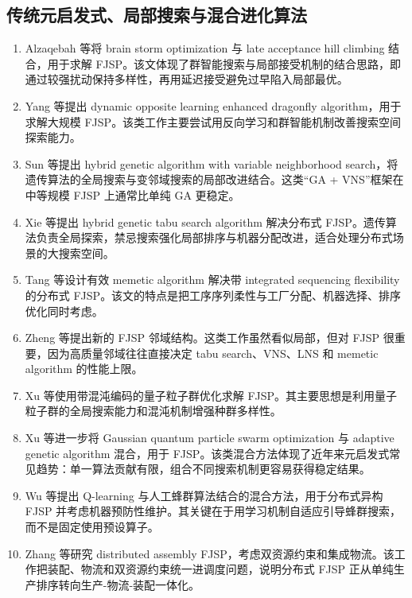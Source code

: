 \documentclass[UTF8,a4paper,11pt]{ctexart}
\begin{document}
\subsection{传统元启发式、局部搜索与混合进化算法}

\begin{enumerate}[label=\textbf{H\arabic*.},leftmargin=3em]
\item Alzaqebah 等将 brain storm optimization 与 late acceptance hill climbing 结合，用于求解 FJSP\cite{Alzaqebah2022}。该文体现了群智能搜索与局部接受机制的结合思路，即通过较强扰动保持多样性，再用延迟接受避免过早陷入局部最优。

\item Yang 等提出 dynamic opposite learning enhanced dragonfly algorithm，用于求解大规模 FJSP\cite{Yang2022Dragonfly}。该类工作主要尝试用反向学习和群智能机制改善搜索空间探索能力。

\item Sun 等提出 hybrid genetic algorithm with variable neighborhood search，将遗传算法的全局搜索与变邻域搜索的局部改进结合\cite{Sun2023HGA}。这类“GA + VNS”框架在中等规模 FJSP 上通常比单纯 GA 更稳定。

\item Xie 等提出 hybrid genetic tabu search algorithm 解决分布式 FJSP\cite{Xie2023HGTS}。遗传算法负责全局探索，禁忌搜索强化局部排序与机器分配改进，适合处理分布式场景的大搜索空间。

\item Tang 等设计有效 memetic algorithm 解决带 integrated sequencing flexibility 的分布式 FJSP\cite{Tang2024DFJSP}。该文的特点是把工序序列柔性与工厂分配、机器选择、排序优化同时考虑。

\item Zheng 等提出新的 FJSP 邻域结构\cite{Zheng2025Neighborhood}。这类工作虽然看似局部，但对 FJSP 很重要，因为高质量邻域往往直接决定 tabu search、VNS、LNS 和 memetic algorithm 的性能上限。

\item Xu 等使用带混沌编码的量子粒子群优化求解 FJSP\cite{Xu2025QPSO}。其主要思想是利用量子粒子群的全局搜索能力和混沌机制增强种群多样性。

\item Xu 等进一步将 Gaussian quantum particle swarm optimization 与 adaptive genetic algorithm 混合，用于 FJSP\cite{Xu2025HGQPSO}。该类混合方法体现了近年来元启发式常见趋势：单一算法贡献有限，组合不同搜索机制更容易获得稳定结果。

\item Wu 等提出 Q-learning 与人工蜂群算法结合的混合方法，用于分布式异构 FJSP 并考虑机器预防性维护\cite{Wu2025ABCQL}。其关键在于用学习机制自适应引导蜂群搜索，而不是固定使用预设算子。

\item Zhang 等研究 distributed assembly FJSP，考虑双资源约束和集成物流\cite{Zhang2025DAFJSP}。该工作把装配、物流和双资源约束统一进调度问题，说明分布式 FJSP 正从单纯生产排序转向生产-物流-装配一体化。
\end{enumerate}
\end{document}
